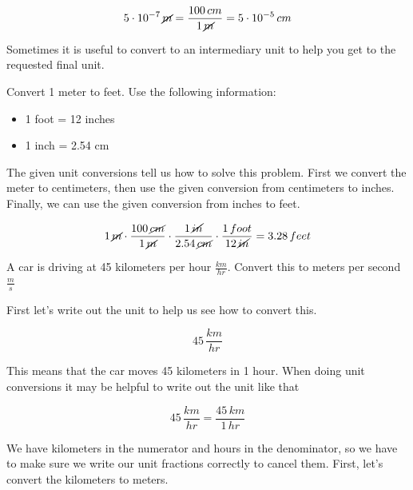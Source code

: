 \documentclass[12pt]{book}
\begin{document}
\begin{equation}
5 \cdot 10^{-7} \, \cancel{m} = \frac{100 \, cm}{1 \, \cancel{m}} = 5 \cdot 10^{-5} \, cm 
\end{equation}

Sometimes it is useful to convert to an intermediary unit to help you get to the requested final unit.

\linespace

\example

Convert 1 meter to feet. Use the following information:

\begin{itemize}
\item 1 foot = 12 inches
\item 1 inch = 2.54 cm
\end{itemize}

The given unit conversions tell us how to solve this problem. First we convert the meter to centimeters, then use the given conversion from centimeters to inches. Finally, we can use the given conversion from inches to feet.

\begin{equation}
1 \, \cancel{m} \cdot \frac{100 \, \cancel{cm}}{1 \, \cancel{m}} \cdot \frac{1 \, \cancel{in}}{2.54 \, \cancel{cm}} \cdot \frac{1 \, foot}{12 \, \cancel{in}} = 3.28 \, feet
\end{equation}

\linespace

\example

A car is driving at 45 kilometers per hour $\frac{km}{hr}$. Convert this to meters per second $\frac{m}{s}$

\hspace{10pt}

First let's write out the unit to help us see how to convert this.

\begin{equation}
45 \, \frac{km}{hr}
\end{equation}

This means that the car moves 45 kilometers in 1 hour. When doing unit conversions it may be helpful to write out the unit like that

\begin{equation}
45 \, \frac{km}{hr} = \frac{45 \, km}{1 \, hr}
\end{equation}

We have kilometers in the numerator and hours in the denominator, so we have to make sure we write our unit fractions correctly to cancel them. First, let's convert the kilometers to meters.
\end{document}
